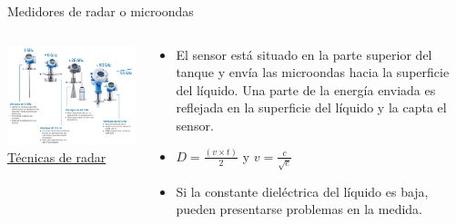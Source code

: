 \documentclass[aspectratio=169]{beamer}
\begin{document}
\begin{frame}{Medidores de radar o microondas}
    \begin{columns}[c, onlytextwidth]
        \begin{column}{0.5\textwidth}
                \centering
            \includegraphics[width = 0.9\linewidth]{fig/Nivel/radar}\\           \tiny{\href{http://www.edcontrol.com/index.php/instrumentacion/item/12-confusion-en-el-mundo-de-las-mediciones-de-nivel-por-radar-no-es-para-tanto}{Técnicas de radar}}
        \end{column}
        \begin{column}{0.50\textwidth}
        
            \begin{itemize}
                \item El sensor está situado en la parte superior del tanque y envía las microondas hacia la superficie del líquido. Una parte de la energía enviada es reflejada en la superficie del líquido y la capta el sensor.
                \item $D=\frac{(v \times t)}{2}$ y $v=\frac{c}{\sqrt{e}}$
                \item Si la constante dieléctrica del líquido es baja, pueden presentarse problemas en la medida.
                
            \end{itemize}
        
        \end{column}
    \end{columns}
\end{frame}
\end{document}
